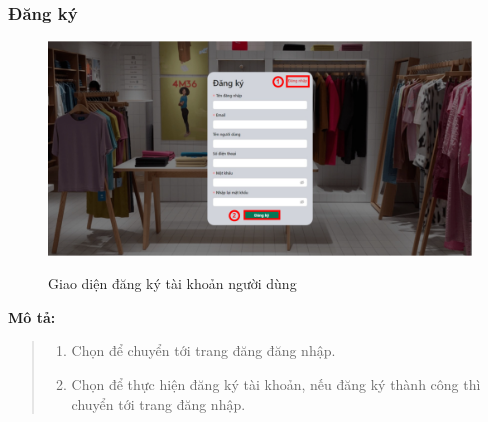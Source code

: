     \subsubsection{Đăng ký}
    \begin{figure}[!htp]
        \centering
        \includegraphics[width=5in]{img/UI/new_customer/register.png}
        \label{2}
        \newline
        \caption{Giao diện đăng ký tài khoản người dùng}
    \end{figure}
    \textbf{Mô tả:}  
    \begin{quote}
        \begin{enumerate}
            \item Chọn để chuyển tới trang đăng đăng nhập.
            \item Chọn để thực hiện đăng ký tài khoản, nếu đăng ký thành công thì chuyển tới trang đăng nhập.
        \end{enumerate}
    \end{quote}
   
   
